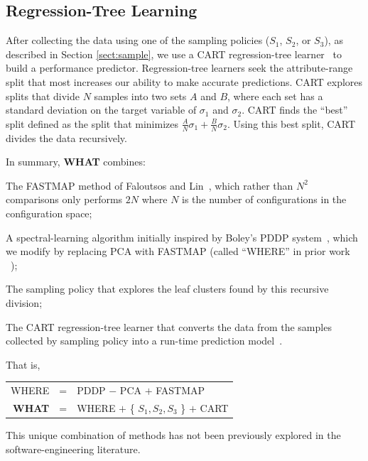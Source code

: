 \documentclass[smallextended]{svjour3}       %
\newcommand{\what}{{\bf WHAT}\xspace}
\begin{document}
\subsection{Regression-Tree Learning} \label{rtlearning}
After collecting the data using one of the sampling policies ($S_1$, $S_2$, or $S_3$), as described in Section \ref{sect:sample}, we  use a CART regression-tree learner~\cite{breiman1984} to build a performance predictor. Regression-tree learners seek the attribute-range split that most increases
our ability to make accurate predictions.
CART explores splits that divide $N$ samples  into two sets  $A$ and $B$, where each set  has a  standard deviation on the target variable of $\sigma_1$ and  $\sigma_2$.
CART finds the ``best'' split defined as the split that minimizes $\frac{A}{N}\sigma_1 + \frac{B}{N}\sigma_2$.
Using this best split, CART divides the data recursively.

In summary, \what  combines:
\begin{compactitem}
\item
The FASTMAP method of Faloutsos and Lin~\cite{Faloutsos1995}, which rather than $N^2$ comparisons only performs $2N$ where $N$ is the number of configurations in the configuration space;

\item A spectral-learning algorithm initially   inspired by    Boley's PDDP system~\cite{boley98}, which we modify
by replacing  PCA with FASTMAP (called
``WHERE'' in prior work ~\cite{me12d});

\item
The sampling policy that explores the leaf clusters found by this recursive division;

\item 
The CART regression-tree learner that converts the data from the samples collected by sampling policy 
into a run-time prediction model~\cite{breiman1984}.
\end{compactitem}
That is,
\begin{center}
\begin{tabular}{rcl}
WHERE& = &PDDP $-$ PCA $+$ FASTMAP\\[1.5ex] 
\what& =  & WHERE $+$ \{ $S_1, S_2, S_3$ \} $+$ CART
\end{tabular}
\end{center}
This unique combination of methods has not been previously explored in the
software-engineering literature.
\end{document}
